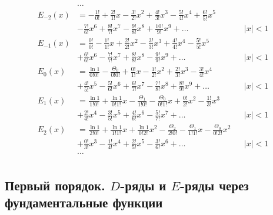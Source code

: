 \begin{equation*} \begin{aligned}
&\ldots \\
%
E_{-2}(x) &= 
- \frac{1!}{0!}
+ \frac{2!}{1!} x
- \frac{3!}{2!} x^2
+ \frac{4!}{3!} x^3
- \frac{5!}{4!} x^4
+ \frac{6!}{5!} x^5 \\ &
- \frac{7!}{6!} x^6
+ \frac{8!}{7!} x^7
- \frac{9!}{8!} x^8
+ \frac{10!}{9!} x^9
+ \ldots & 
&|x| < 1 \\
%
E_{-1}(x) &=  
  \frac{0!}{0!}
- \frac{1!}{1!} x
+ \frac{2!}{2!} x^2
- \frac{3!}{3!} x^3
+ \frac{4!}{4!} x^4
- \frac{5!}{5!} x^5 \\ &
+ \frac{6!}{6!} x^6
- \frac{7!}{7!} x^7
+ \frac{8!}{8!} x^8
- \frac{9!}{9!} x^9
+ \ldots & 
&|x| < 1 \\
%
E_0(x) &=
  \frac{\ln{1}}{0!0!}
- \frac{\Theta_0}{0!0!}
+ \frac{0!}{1!} x 
- \frac{1!}{2!} x^2
+ \frac{2!}{3!} x^3
- \frac{3!}{4!} x^4 \\ &
+ \frac{4!}{5!} x^5
- \frac{5!}{6!} x^6
+ \frac{6!}{7!} x^7
- \frac{7!}{8!} x^8
+ \frac{8!}{9!} x^9
+ \ldots & 
&|x| < 1 \\
%
E_1(x) &=
  \frac{\ln{1}}{1!0!} 
+ \frac{\ln{1}}{0!1!} x 
- \frac{\Theta_1}{1!0!}
- \frac{\Theta_0}{0!1!} x
+ \frac{0!}{2!} x^2
- \frac{1!}{3!} x^3 \\ &
+ \frac{2!}{4!} x^4
- \frac{3!}{5!} x^5
+ \frac{4!}{6!} x^6
- \frac{5!}{7!} x^7
+ \ldots & 
&|x| < 1 \\
%
E_2(x) &=
  \frac{\ln{1}}{2!0!}
+ \frac{\ln{1}}{1!1!} x
+ \frac{\ln{1}}{0!2!} x^2
- \frac{\Theta_2}{2!0!}
- \frac{\Theta_1}{1!1!} x
- \frac{\Theta_0}{0!2!} x^2 \\ &
+ \frac{0!}{3!} x^3
- \frac{1!}{4!} x^4
+ \frac{2!}{5!} x^5
- \frac{3!}{6!} x^6
+ \ldots & 
&|x| < 1 \\
%
&\ldots \\
\end{aligned} \end{equation*}

\subsection{Первый порядок. $D$-ряды и $E$-ряды через фундаментальные функции}


